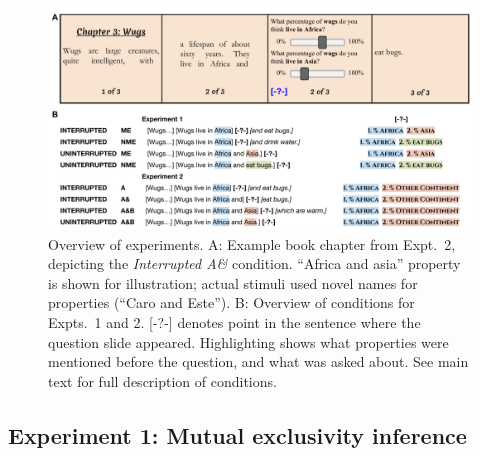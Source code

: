 \documentclass[10pt,letterpaper]{article}
\newcommand{\red}[1]{{\textcolor{Red}{#1}}}
\begin{document}


\begin{figure}[h]
  \centering
    \includegraphics[width=1\textwidth]{design}
    \vspace{-0.5cm}
  \caption{Overview of experiments. A: Example book chapter from Expt.~2, depicting the \emph{Interrupted A\&} condition. ``Africa and asia'' property is shown for illustration; actual stimuli used novel names for properties (``Caro and Este''). B: Overview of conditions for Expts.~1 and 2. [-?-] denotes point in the sentence where the question slide appeared. Highlighting shows what properties were mentioned before the question, and what was asked about. See main text for full description of conditions.}
  \label{fig:design}
          \vspace{-0.5cm}
\end{figure}

\subsection{Experiment 1: Mutual exclusivity inference}

\end{document}
